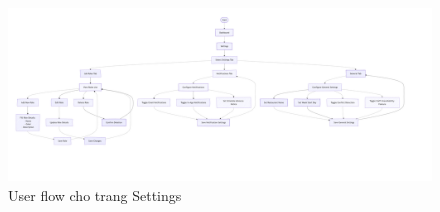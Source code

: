\begin{figure}[H]
	\centering
	\includegraphics[width=15cm]{Sections/tong_quan/functional_spec/img/setting1.png}

     \vspace{0.5cm}
    \caption{User flow cho trang Settings}
\end{figure}